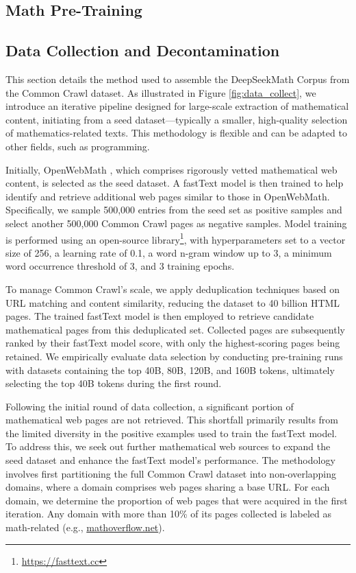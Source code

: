 \begin{itemize}[topsep=0pt]
\section{Math Pre-Training}

\subsection{Data Collection and Decontamination}

This section details the method used to assemble the DeepSeekMath Corpus from the Common Crawl dataset. As illustrated in Figure \ref{fig:data_collect}, we introduce an iterative pipeline designed for large-scale extraction of mathematical content, initiating from a seed dataset—typically a smaller, high-quality selection of mathematics-related texts. This methodology is flexible and can be adapted to other fields, such as programming.

Initially, OpenWebMath \citep{openwebmath}, which comprises rigorously vetted mathematical web content, is selected as the seed dataset. A fastText model \citep{joulin2016fasttext} is then trained to help identify and retrieve additional web pages similar to those in OpenWebMath. Specifically, we sample 500,000 entries from the seed set as positive samples and select another 500,000 Common Crawl pages as negative samples. Model training is performed using an open-source library\footnote{\url{https://fasttext.cc}}, with hyperparameters set to a vector size of 256, a learning rate of 0.1, a word n-gram window up to 3, a minimum word occurrence threshold of 3, and 3 training epochs. 

To manage Common Crawl's scale, we apply deduplication techniques based on URL matching and content similarity, reducing the dataset to 40 billion HTML pages. The trained fastText model is then employed to retrieve candidate mathematical pages from this deduplicated set. Collected pages are subsequently ranked by their fastText model score, with only the highest-scoring pages being retained. We empirically evaluate data selection by conducting pre-training runs with datasets containing the top 40B, 80B, 120B, and 160B tokens, ultimately selecting the top 40B tokens during the first round.

Following the initial round of data collection, a significant portion of mathematical web pages are not retrieved. This shortfall primarily results from the limited diversity in the positive examples used to train the fastText model. To address this, we seek out further mathematical web sources to expand the seed dataset and enhance the fastText model's performance. The methodology involves first partitioning the full Common Crawl dataset into non-overlapping domains, where a domain comprises web pages sharing a base URL. For each domain, we determine the proportion of web pages that were acquired in the first iteration. Any domain with more than 10\% of its pages collected is labeled as math-related (e.g., \url{mathoverflow.net}).


\end{itemize}
